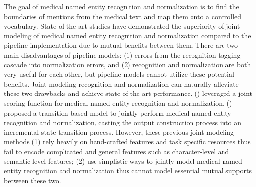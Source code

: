 The goal of medical named entity recognition and normalization is to find the boundaries of mentions from the medical text and map them onto a controlled vocabulary. State-of-the-art studies have demonstrated the superiority of joint modeling of medical named entity recognition and normalization compared to the pipeline implementation due to mutual benefits between them. There are two main disadvantages of pipeline models: (1) errors from the recognition tagging cascade into normalization errors, and (2) recognition and normalization are both very useful for each other, but pipeline models cannot utilize these potential benefits. Joint modeling recognition and normalization can naturally alleviate these two drawbacks and achieve state-of-the-art performance. \citeauthor{Leaman2016TaggerOne} (\citeyear{Leaman2016TaggerOne}) leveraged a joint scoring function for medical named entity recognition and normalization. \citeauthor{Lou2017A} (\citeyear{Lou2017A}) proposed a transition-based model to jointly perform medical named entity recognition and normalization, casting the output construction process into an incremental state transition process. However, these previous joint modeling methods (1) rely heavily on hand-crafted features and task specific resources thus fail to encode complicated and general features such as character-level and semantic-level features; 
(2) use simplistic ways to jointly model medical named entity recognition and normalization thus cannot model essential mutual supports between these two.   


